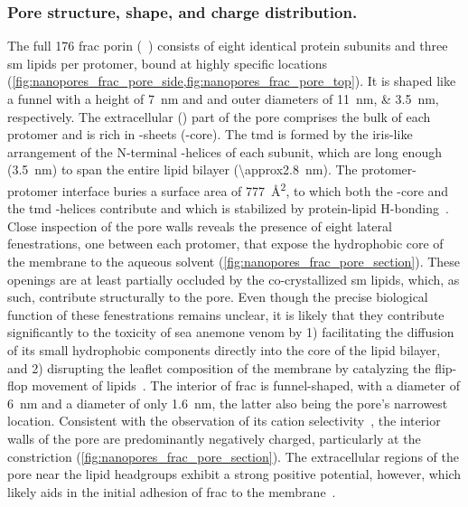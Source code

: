 \subsubsection{Pore structure, shape, and charge distribution.}

The full \SI{176}{\kDa} \Gls{frac} porin (~\cite{Tanaka-2015}) consists of eight identical protein
subunits and three \gls{sm} lipids per protomer, bound at highly specific locations
(\cref{fig:nanopores_frac_pore_side,fig:nanopores_frac_pore_top}). It is shaped like a funnel with a height of
\SI{7}{\nm} and \cisi{} and \transi{} outer diameters of \SIlist{11;3.5}{\nm}, respectively. The extracellular
(\cisi) part of the pore comprises the bulk of each protomer and is rich in \tb-sheets (\tb-core). The
\gls{tmd} is formed by the iris-like arrangement of the N-terminal \ta-helices of each subunit, which are long
enough (\SI{3.5}{\nm}) to span the entire lipid bilayer (\SI{\approx2.8}{\nm}). The protomer-protomer
interface buries a surface area of \SI{777}{\square\angstrom}, to which both the \tb-core and the \gls{tmd}
\ta-helices contribute and which is stabilized by protein-lipid H-bonding~\cite{Tanaka-2015}. Close inspection
of the pore walls reveals the presence of eight lateral fenestrations, one between each protomer, that expose
the hydrophobic core of the membrane to the aqueous solvent (\cref{fig:nanopores_frac_pore_section}). These
openings are at least partially occluded by the co-crystallized \gls{sm} lipids, which, as such, contribute
structurally to the pore. Even though the precise biological function of these fenestrations remains unclear,
it is likely that they contribute significantly to the toxicity of sea anemone venom by 1) facilitating the
diffusion of its small hydrophobic components directly into the core of the lipid bilayer, and 2) disrupting
the leaflet composition of the membrane by catalyzing the flip-flop movement of lipids~\cite{Tanaka-2015}. The
interior of \gls{frac} is funnel-shaped, with a \cisi{} diameter of \SI{6}{\nm} and a \trans{} diameter of
only \SI{1.6}{\nm}, the latter also being the pore's narrowest location. Consistent with the observation of
its cation selectivity~\cite{Garcia-Ortega-2011,Wloka-2016}, the interior walls of the pore are predominantly
negatively charged, particularly at the \transi{} constriction (\cref{fig:nanopores_frac_pore_section}). The
extracellular regions of the pore near the lipid headgroups exhibit a strong positive potential, however, which
likely aids in the initial adhesion of \gls{frac} to the membrane~\cite{Tanaka-2015}.

